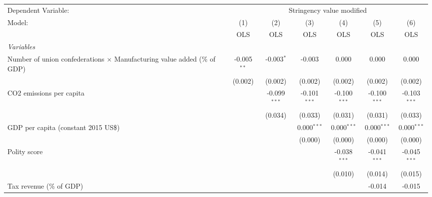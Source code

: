 
\begingroup
\centering
\begin{tabular}{lcccccc}
   \toprule
   Dependent Variable: & \multicolumn{6}{c}{Stringency value modified}\\
   Model:                                                                          & (1)           & (2)            & (3)            & (4)            & (5)            & (6)\\  
                                                                                   &  OLS          & OLS            & OLS            & OLS            & OLS            & OLS\\  
   \midrule
   \emph{Variables}\\
   Number of union confederations $\times$ Manufacturing value added (\% of GDP)   & -0.005$^{**}$ & -0.003$^{*}$   & -0.003         & 0.000          & 0.000          & 0.000\\   
                                                                                   & (0.002)       & (0.002)        & (0.002)        & (0.002)        & (0.002)        & (0.002)\\   
   CO2 emissions per capita                                                        &               & -0.099$^{***}$ & -0.101$^{***}$ & -0.100$^{***}$ & -0.100$^{***}$ & -0.103$^{***}$\\   
                                                                                   &               & (0.034)        & (0.033)        & (0.031)        & (0.031)        & (0.033)\\   
   GDP per capita (constant 2015 US\$)                                             &               &                & 0.000$^{***}$  & 0.000$^{***}$  & 0.000$^{***}$  & 0.000$^{***}$\\   
                                                                                   &               &                & (0.000)        & (0.000)        & (0.000)        & (0.000)\\   
   Polity score                                                                    &               &                &                & -0.038$^{***}$ & -0.041$^{***}$ & -0.045$^{***}$\\   
                                                                                   &               &                &                & (0.010)        & (0.014)        & (0.015)\\   
   Tax revenue (\% of GDP)                                                         &               &                &                &                & -0.014         & -0.015\\   

\end{tabular}
